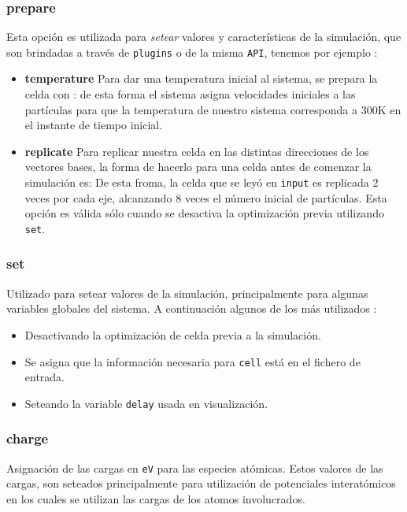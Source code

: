 \subsubsection{prepare}
Esta opci\'on es utilizada para \textit{setear} valores y caracter\'isticas de la simulaci\'on, que son brindadas a trav\'es de \verb|plugins| o de la misma \verb|API|, tenemos por ejemplo :

\begin{itemize}
 \item \textbf{temperature}
Para dar una temperatura inicial al sistema, se prepara la celda con :
de esta forma el sistema asigna velocidades iniciales a las part\'iculas para que la temperatura de nuestro sistema corresponda a 300K en el instante de tiempo inicial.
 \item \textbf{replicate}
Para replicar nuestra celda en las distintas direcciones de los vectores bases, la forma de hacerlo para una celda antes de comenzar la simulaci\'on es:
De esta froma, la celda que se ley\'o en \verb|input| es replicada 2 veces por cada eje, alcanzando 8 veces el n\'umero inicial de part\'iculas. Esta opci\'on es v\'alida s\'olo cuando se desactiva la optimizaci\'on previa utilizando \verb|set|.
\end{itemize}

\subsubsection{set}
Utilizado para setear valores de la simulaci\'on, principalmente para algunas variables globales del sistema. A continuaci\'on algunos de los m\'as utilizados :

\begin{itemize}
 \item Desactivando la optimizaci\'on de celda previa a la simulaci\'on.
 \item Se asigna que la informaci\'on necesaria para \texttt{cell} est\'a en el fichero de entrada.
 \item Seteando la variable \texttt{delay} usada en visualizaci\'on.
\end{itemize}

\subsubsection{charge}
Asignaci\'on de las cargas en \verb|eV| para las especies at\'omicas. Estos valores de las cargas, son seteados principalmente para utilizaci\'on de potenciales interat\'omicos en los cuales se utilizan las cargas de los atomos involucrados.


